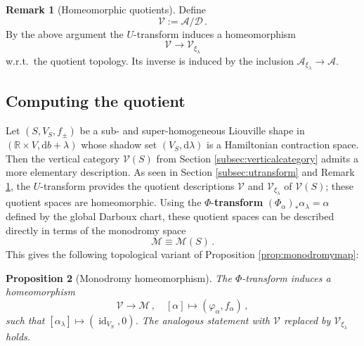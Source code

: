 \documentclass{amsart}
\newtheorem{prop}{Proposition}[subsection]
\theoremstyle{definition}
\newtheorem{rem}[prop]{Remark}
\newcommand{\AAA}{\mathcal A}
\newcommand{\rmd}{\mathrm d}
\newcommand{\DD}{\mathcal D}
\newcommand{\MM}{\mathcal M}
\newcommand{\R}{\mathbb R}
\newcommand{\VV}{\mathcal V}
\newcommand{\lra}{\longrightarrow}
\newcommand{\ra}{\rightarrow}
\DeclareMathOperator{\id}{\mathrm{id}}
\begin{document}
\begin{rem}[Homeomorphic quotients]
\label{rem:homeoquspaces}
Define
  \[
    \VV:=\AAA/\DD
    \,.
  \]
By the above argument
the $U$-transform induces a homeomorphism
  \[
  \VV
  \lra
  \VV_{\xi_{\lambda}}
  \]
w.r.t.\ the quotient topology.
Its inverse is induced by the inclusion
$\AAA_{\xi_{\lambda}}\ra\AAA$.
\end{rem}



\subsection{Computing the quotient\label{subsec:compquot}}


Let $(S,V_S,f_{\pm})$
be a sub- and super-homogeneous Liouville shape
in $(\R\times V,\rmd b+\lambda)$
whose shadow set $(V_S,\rmd\lambda)$
is a Hamiltonian contraction space.
Then the vertical category $\VV(S)$ from
Section \ref{subsec:verticalcategory}
admits a more elementary description.
As seen in Section \ref{subsec:utransform}
and Remark \ref{rem:homeoquspaces},
the $U$-transform provides the quotient descriptions
$\VV$ and $\VV_{\xi_{\lambda}}$ of $\VV(S)$;
these quotient spaces are homeomorphic.
Using the $\Phi$-{\bf transform}
$(\Phi_{\alpha})_*\alpha_{\lambda}=\alpha$
defined by the global Darboux chart,
these quotient spaces can be described directly
in terms of the monodromy space
\[
\MM\equiv\MM(S)
\,.
\]
This gives the following topological variant of
Proposition \ref{prop:monodromymap}:


\begin{prop}[Monodromy homeomorphism]
\label{prop:monodromyhomeo}
  The $\Phi$-transform induces a homeomorphism
  \[
  \VV\lra\MM
  \,,
  \quad
  [\alpha]\longmapsto(\varphi_{\alpha},f_{\alpha})
  \,,
  \]
  such that
  $[\alpha_{\lambda}]\mapsto(\id_{V_S},0)$.
  The analogous statement with $\VV$ replaced by
  $\VV_{\xi_{\lambda}}\!$ holds.
\end{prop}
\end{document}

